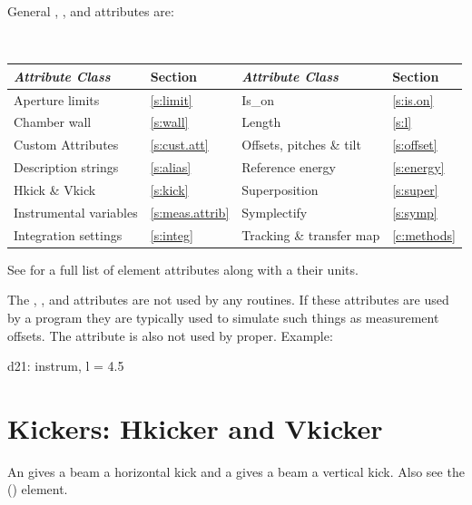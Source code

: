General , , and  attributes are:
\begin{center}
\tt
\begin{tabular}{llll} \toprule
  {\sl Attribute Class}      & Section             & {\sl Attribute Class}      & Section         \\ \midrule
  Aperture limits            & \ref{s:limit}       & Is_on                      & \ref{s:is.on}   \\
  Chamber wall               & \ref{s:wall}        & Length                     & \ref{s:l}       \\
  Custom Attributes          & \ref{s:cust.att}    & Offsets, pitches \& tilt   & \ref{s:offset}  \\ 
  Description strings        & \ref{s:alias}       & Reference energy           & \ref{s:energy}  \\
  Hkick \& Vkick             & \ref{s:kick}        & Superposition              & \ref{s:super}   \\
  Instrumental variables     & \ref{s:meas.attrib} & Symplectify                & \ref{s:symp}    \\
  Integration settings       & \ref{s:integ}       & Tracking \& transfer map   & \ref{c:methods} \\
  \bottomrule
\end{tabular}
\end{center}
\toffset
See  for a full list of element attributes along with a their units.

The , , and  attributes are not
used by any \bmad routines. If these attributes are used by a program
they are typically used to simulate such things as measurement
offsets. The  attribute is also not used by \bmad
proper. Example:
\begin{example}
  d21: instrum, l = 4.5
\end{example}

\section{Kickers: Hkicker and Vkicker}
\label{s:hvkicker}

An  gives a beam a horizontal kick and a  gives a 
beam a vertical kick. Also see the  () element.

